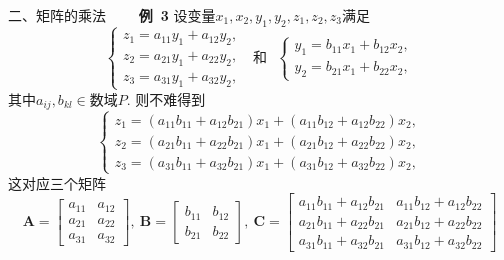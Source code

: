 \documentclass[compress,mathserif,cjk]{beamer}
\theoremstyle{remark}
\numberwithin{equation}{section}
\newcommand{\hei}{\bf}      %
\begin{document}
\begin{CJK}{UTF8}{gbsn}
\begin{frame}{二、矩阵的乘法}
 \ \ \ \ {\hei 例~3} 设变量$x_1,x_2,y_1,y_2,z_1,z_2,z_3$满足
 $$\left\{\begin{array}{l}z_1=a_{11}y_1+a_{12}y_2,\\z_2=a_{21}y_1+a_{22}y_2,\\z_3=a_{31}y_1+a_{32}y_2,\end{array}\right. ~~~\mbox{和}~~~
 \left\{\begin{array}{l}y_1=b_{11}x_1+b_{12}x_2,\\y_2=b_{21}x_1+b_{22}x_2,\end{array}\right.$$
 其中$a_{ij},b_{kl}\in$数域$P$. 则不难得到
 $$\left\{\begin{array}{l}z_1=(a_{11}b_{11}+a_{12}b_{21})x_1+(a_{11}b_{12}+a_{12}b_{22})x_2,\\z_2=(a_{21}b_{11}+a_{22}b_{21})x_1+(a_{21}b_{12}+a_{22}b_{22})x_2,\\
 z_3=(a_{31}b_{11}+a_{32}b_{21})x_1+(a_{31}b_{12}+a_{32}b_{22})x_2,\end{array}\right.$$
 \pause 这对应三个矩阵
\footnotesize
 $$\bm A=\left[\begin{matrix}a_{11}&a_{12}\\a_{21}&a_{22}\\a_{31}&a_{32}\end{matrix}\right],~\bm B=\left[\begin{matrix}b_{11}&b_{12}\\b_{21}&b_{22}\end{matrix}\right],~
 \bm C=\left[\begin{matrix}a_{11}b_{11}+a_{12}b_{21}&a_{11}b_{12}+a_{12}b_{22}\\a_{21}b_{11}+a_{22}b_{21}&a_{21}b_{12}+a_{22}b_{22}\\
 a_{31}b_{11}+a_{32}b_{21}&a_{31}b_{12}+a_{32}b_{22}\end{matrix}\right]$$

\end{frame}


\end{CJK}
\end{document}

